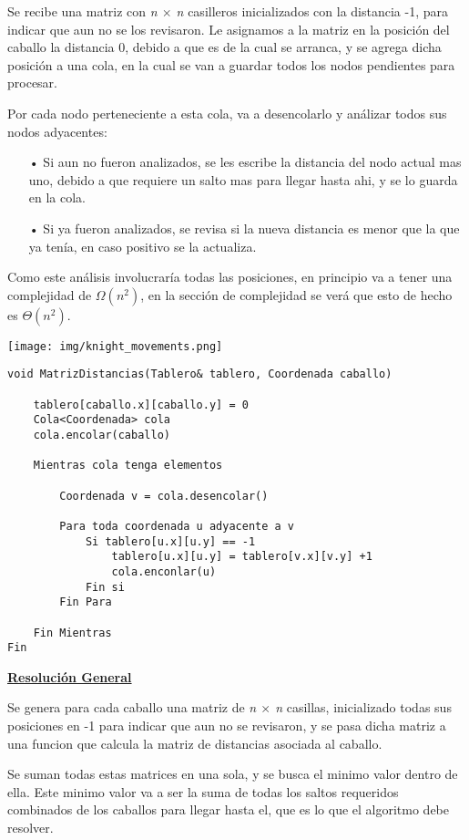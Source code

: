 Se recibe una matriz con \textit{n $\times$  n} casilleros inicializados con la distancia -1, para indicar que aun no se los revisaron. Le asignamos a la matriz en la posición del caballo la distancia 0, debido a que es de la cual se arranca, y se agrega dicha posición a una cola, en la cual se van a guardar todos los nodos pendientes para procesar. 

Por cada nodo perteneciente a esta cola, va a desencolarlo y análizar todos sus nodos adyacentes:
\begin{itemize}
\item[•]Si aun no fueron analizados, se les escribe la distancia del nodo actual mas uno, debido a que requiere un salto mas para llegar hasta ahi, y se lo guarda en la cola.
\item[•]Si ya fueron analizados, se revisa si la nueva distancia es menor que la que ya tenía, en caso positivo se la actualiza.
\end{itemize}

Como este análisis involucraría todas las posiciones, en principio va a tener una complejidad de $\Omega(n^2)$, en la sección de complejidad se verá que esto de hecho es $\Theta(n^2)$. 
\bigskip

\begin{center}
\texttt{[image: img/knight\_movements.png]}
\end{center}
\newpage
\begin{lstlisting}
void MatrizDistancias(Tablero& tablero, Coordenada caballo)

	tablero[caballo.x][caballo.y] = 0
	Cola<Coordenada> cola
	cola.encolar(caballo)
	
	Mientras cola tenga elementos
	
		Coordenada v = cola.desencolar()
		
		Para toda coordenada u adyacente a v
			Si tablero[u.x][u.y] == -1
				tablero[u.x][u.y] = tablero[v.x][v.y] +1
				cola.enconlar(u)	
			Fin si
		Fin Para
		
	Fin Mientras
Fin
\end{lstlisting}

\noindent \underline{\textbf{Resolución General}}

Se genera para cada caballo una matriz de \textit{n $\times$  n} casillas, inicializado todas sus posiciones en -1 para indicar que aun no se revisaron, y se pasa dicha matriz a una funcion que calcula la matriz de distancias asociada al caballo.

Se suman todas estas matrices en una sola, y se busca el minimo valor dentro de ella. Este minimo valor va a ser la suma de todas los saltos requeridos combinados de los caballos para llegar hasta el, que es lo que el algoritmo debe resolver. 

